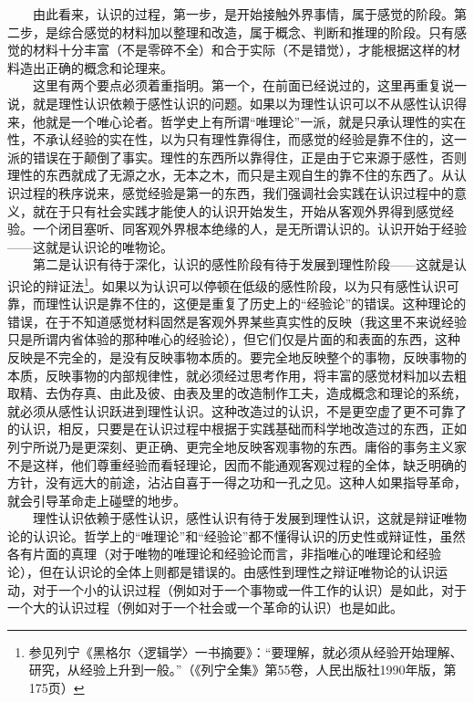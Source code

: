 \documentclass[cn,11pt,chinese]{elegantbook}
\begin{document}
　　由此看来，认识的过程，第一步，是开始接触外界事情，属于感觉的阶段。第二步，是综合感觉的材料加以整理和改造，属于概念、判断和推理的阶段。只有感觉的材料十分丰富（不是零碎不全）和合于实际（不是错觉），才能根据这样的材料造出正确的概念和论理来。\\
　　这里有两个要点必须着重指明。第一个，在前面已经说过的，这里再重复说一说，就是理性认识依赖于感性认识的问题。如果以为理性认识可以不从感性认识得来，他就是一个唯心论者。哲学史上有所谓“唯理论”一派，就是只承认理性的实在性，不承认经验的实在性，以为只有理性靠得住，而感觉的经验是靠不住的，这一派的错误在于颠倒了事实。理性的东西所以靠得住，正是由于它来源于感性，否则理性的东西就成了无源之水，无本之木，而只是主观自生的靠不住的东西了。从认识过程的秩序说来，感觉经验是第一的东西，我们强调社会实践在认识过程中的意义，就在于只有社会实践才能使人的认识开始发生，开始从客观外界得到感觉经验。一个闭目塞听、同客观外界根本绝缘的人，是无所谓认识的。认识开始于经验——这就是认识论的唯物论。\\
　　第二是认识有待于深化，认识的感性阶段有待于发展到理性阶段——这就是认识论的辩证法\footnote[7]{ 参见列宁《黑格尔〈逻辑学〉一书摘要》：“要理解，就必须从经验开始理解、研究，从经验上升到一般。”（《列宁全集》第55卷，人民出版社1990年版，第175页）}。如果以为认识可以停顿在低级的感性阶段，以为只有感性认识可靠，而理性认识是靠不住的，这便是重复了历史上的“经验论”的错误。这种理论的错误，在于不知道感觉材料固然是客观外界某些真实性的反映（我这里不来说经验只是所谓内省体验的那种唯心的经验论），但它们仅是片面的和表面的东西，这种反映是不完全的，是没有反映事物本质的。要完全地反映整个的事物，反映事物的本质，反映事物的内部规律性，就必须经过思考作用，将丰富的感觉材料加以去粗取精、去伪存真、由此及彼、由表及里的改造制作工夫，造成概念和理论的系统，就必须从感性认识跃进到理性认识。这种改造过的认识，不是更空虚了更不可靠了的认识，相反，只要是在认识过程中根据于实践基础而科学地改造过的东西，正如列宁所说乃是更深刻、更正确、更完全地反映客观事物的东西。庸俗的事务主义家不是这样，他们尊重经验而看轻理论，因而不能通观客观过程的全体，缺乏明确的方针，没有远大的前途，沾沾自喜于一得之功和一孔之见。这种人如果指导革命，就会引导革命走上碰壁的地步。\\
　　理性认识依赖于感性认识，感性认识有待于发展到理性认识，这就是辩证唯物论的认识论。哲学上的“唯理论”和“经验论”都不懂得认识的历史性或辩证性，虽然各有片面的真理（对于唯物的唯理论和经验论而言，非指唯心的唯理论和经验论），但在认识论的全体上则都是错误的。由感性到理性之辩证唯物论的认识运动，对于一个小的认识过程（例如对于一个事物或一件工作的认识）是如此，对于一个大的认识过程（例如对于一个社会或一个革命的认识）也是如此。\\
\end{document}
